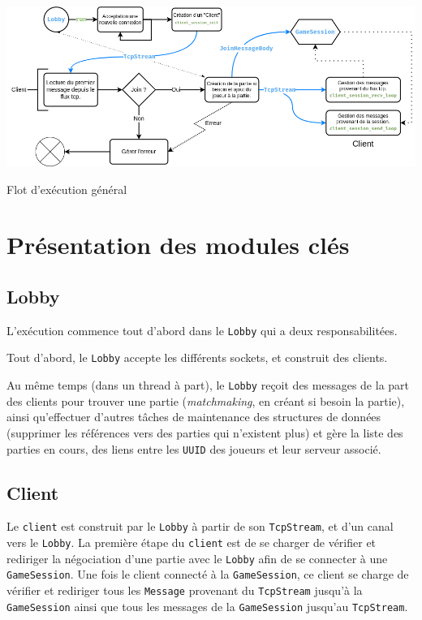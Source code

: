 \documentclass{EPUProjetDi}
\begin{document}
\begin{center}
  \includegraphics[width=\linewidth]{Diagramme flux.png}
  \label{fig:DiagrammeFlux}

  Flot d'exécution général
\end{center}

\chapter{Présentation des modules clés}

\section{Lobby}

L'exécution commence tout d'abord dans le \verb|Lobby| qui a deux responsabilitées.

Tout d'abord, le \verb|Lobby| accepte les différents sockets, et construit des clients.

Au même temps (dans un thread à part), le \verb|Lobby| reçoit des messages de la part des clients pour trouver une partie (\textit{matchmaking}, en créant si besoin la partie), ainsi qu'effectuer d'autres tâches de maintenance des structures de données (supprimer les références vers des parties qui n'existent plus) et gère la liste des parties en cours, des liens entre les \verb|UUID| des joueurs et leur serveur associé.

\section{Client}

Le \verb|client| est construit par le \verb|Lobby| à partir de son \verb|TcpStream|, et d'un canal vers le \verb|Lobby|. La première étape du \verb|client| est de se charger de vérifier et rediriger la négociation d'une partie avec le \verb|Lobby| afin de se connecter à une \verb|GameSession|. Une fois le client connecté à la \verb|GameSession|, ce client se charge de vérifier et rediriger tous les \verb|Message| provenant du \verb|TcpStream| jusqu'à la \verb|GameSession| ainsi que tous les messages de la \verb|GameSession| jusqu'au \verb|TcpStream|.
\end{document}
